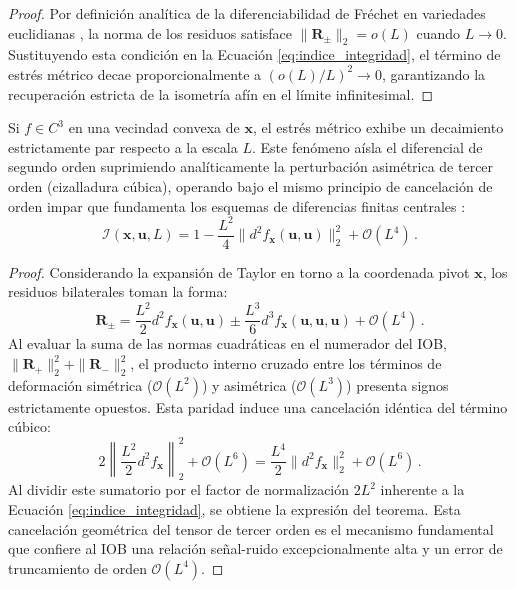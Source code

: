 \documentclass[11pt]{article}
\begin{document}
\begin{proof}
Por definición analítica de la diferenciabilidad de Fréchet en variedades euclidianas \cite{lee2012smooth}, la norma de los residuos satisface $\|\mathbf{R}_{\pm}\|_2 = o(L)$ cuando $L \to 0$. Sustituyendo esta condición en la Ecuación \eqref{eq:indice_integridad}, el término de estrés métrico decae proporcionalmente a $(o(L)/L)^2 \to 0$, garantizando la recuperación estricta de la isometría afín en el límite infinitesimal.
\end{proof}

\begin{theorem} \label{thm:aislamiento_curvatura}
Si $f \in C^3$ en una vecindad convexa de $\mathbf{x}$, el estrés métrico exhibe un decaimiento estrictamente par respecto a la escala $L$. Este fenómeno aísla el diferencial de segundo orden suprimiendo analíticamente la perturbación asimétrica de tercer orden (cizalladura cúbica), operando bajo el mismo principio de cancelación de orden impar que fundamenta los esquemas de diferencias finitas centrales \cite{burden2015numerical}:
\begin{equation}
    \mathcal{I}(\mathbf{x}, \mathbf{u}, L) = 1 - \frac{L^2}{4} \|d^2 f_{\mathbf{x}}(\mathbf{u}, \mathbf{u})\|_2^2 + \mathcal{O}(L^4) \,.
\end{equation}
\end{theorem}

\begin{proof}
Considerando la expansión de Taylor en torno a la coordenada pivot $\mathbf{x}$, los residuos bilaterales toman la forma:
\begin{equation*}
    \mathbf{R}_{\pm} = \frac{L^2}{2} d^2 f_{\mathbf{x}}(\mathbf{u}, \mathbf{u}) \pm \frac{L^3}{6} d^3 f_{\mathbf{x}}(\mathbf{u}, \mathbf{u}, \mathbf{u}) + \mathcal{O}(L^4) \,.
\end{equation*}
Al evaluar la suma de las normas cuadráticas en el numerador del IOB, $\|\mathbf{R}_+\|_2^2 + \|\mathbf{R}_-\|_2^2$, el producto interno cruzado entre los términos de deformación simétrica ($\mathcal{O}(L^2)$) y asimétrica ($\mathcal{O}(L^3)$) presenta signos estrictamente opuestos. Esta paridad induce una cancelación idéntica del término cúbico:
\begin{equation*}
    2 \left\| \frac{L^2}{2} d^2 f_{\mathbf{x}} \right\|_2^2 + \mathcal{O}(L^6) = \frac{L^4}{2} \|d^2 f_{\mathbf{x}}\|_2^2 + \mathcal{O}(L^6) \,.
\end{equation*}
Al dividir este sumatorio por el factor de normalización $2L^2$ inherente a la Ecuación \eqref{eq:indice_integridad}, se obtiene la expresión del teorema. Esta cancelación geométrica del tensor de tercer orden es el mecanismo fundamental que confiere al IOB una relación señal-ruido excepcionalmente alta y un error de truncamiento de orden $\mathcal{O}(L^4)$.
\end{proof}
\end{document}
